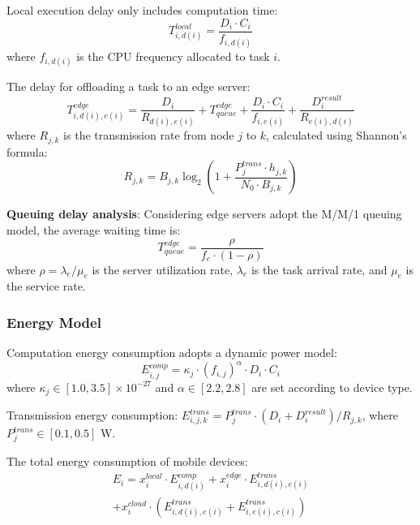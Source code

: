 \documentclass[conference]{IEEEtran}
\begin{document}
Local execution delay only includes computation time:
\begin{equation}
T_{i,d(i)}^{local} = \frac{D_i \cdot C_i}{f_{i,d(i)}}
\end{equation}
where $f_{i,d(i)}$ is the CPU frequency allocated to task $i$.

The delay for offloading a task to an edge server:
\begin{equation}
T_{i,d(i),e(i)}^{edge} = \frac{D_i}{R_{d(i),e(i)}} + T_{queue}^{edge} + \frac{D_i \cdot C_i}{f_{i,e(i)}} + \frac{D_i^{result}}{R_{e(i),d(i)}}
\end{equation}
where $R_{j,k}$ is the transmission rate from node $j$ to $k$, calculated using Shannon's formula:
\begin{equation}
R_{j,k} = B_{j,k} \log_2\left(1 + \frac{P_j^{trans} \cdot h_{j,k}}{N_0 \cdot B_{j,k}}\right)
\end{equation}

\textbf{Queuing delay analysis}: Considering edge servers adopt the M/M/1 queuing model, the average waiting time is:
\begin{equation}
T_{queue}^{edge} = \frac{\rho}{f_e \cdot (1-\rho)}
\end{equation}
where $\rho = \lambda_e / \mu_e$ is the server utilization rate, $\lambda_e$ is the task arrival rate, and $\mu_e$ is the service rate.

\subsubsection{Energy Model}
Computation energy consumption adopts a dynamic power model:
\begin{equation}
E_{i,j}^{comp} = \kappa_j \cdot (f_{i,j})^{\alpha} \cdot D_i \cdot C_i
\end{equation}
where $\kappa_j \in [1.0, 3.5] \times 10^{-27}$ and $\alpha \in [2.2, 2.8]$ are set according to device type.

Transmission energy consumption: $E_{i,j,k}^{trans} = P_j^{trans} \cdot (D_i + D_i^{result})/R_{j,k}$, where $P_j^{trans} \in [0.1, 0.5]$ W.

The total energy consumption of mobile devices:
\begin{equation}
    \begin{split}
        E_i = x_{i}^{local} \cdot E_{i,d(i)}^{comp} + x_{i}^{edge} \cdot E_{i,d(i),e(i)}^{trans} \\ + x_{i}^{cloud} \cdot (E_{i,d(i),e(i)}^{trans} + E_{i,e(i),c(i)}^{trans})
    \end{split}
\end{equation}
\end{document}
